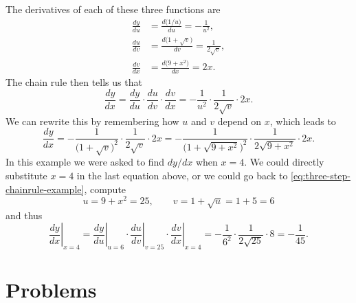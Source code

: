 The derivatives of each of these three functions are
\begin{align*}
\frac{dy}{du} &= \frac{d\bigl(1/u\bigr)}{du} = -\frac{1}{u^2}, \\
\frac{du}{dv} &= \frac{d \bigl(1+\sqrt{v}\bigr)}{dv} = \frac{1}{2\sqrt{v}},  \\
\frac{dv}{dx} &= \frac{d\bigl(9+x^2\bigr)}{dx} = 2x.
\end{align*}
The chain rule then tells us that
\begin{equation}
\frac{dy}{dx}=\frac{dy}{du}\cdot \frac{du}{dv}\cdot \frac{dv}{dx}
=-\frac{1}{u^2}\cdot\frac1{2\sqrt{v}}\cdot 2x.
\label{eq:three-step-chainrule-example}
\end{equation}
We can rewrite this by remembering how $u$ and $v$ depend on $x$, which leads to
\[
\frac{dy} {dx}
= -\frac{1}{\bigl(1+\sqrt{v}\bigr)^2}\cdot\frac1{2\sqrt{v}}\cdot 2x
= -\frac{1}{\bigl(1+\sqrt{9+x^2}\bigr)^2}\cdot\frac1{2\sqrt{9+x^2}}\cdot 2x.
\]
In this example we were asked to find $dy/dx$ when $x=4$. We could directly substitute $x=4$ in the last equation above, or we could go back to \eqref{eq:three-step-chainrule-example}, compute
\[
u=9+x^2 = 25, \qquad v=1+\sqrt{u}=1+5=6
\]
and thus
\[
\left.\frac{dy}{dx}\right|_{x=4}=
\left.\frac{dy}{du}\right|_{u=6}\cdot
\left.\frac{du}{dv}\right|_{v=25}\cdot
\left.\frac{dv}{dx}\right|_{x=4}
= - \frac1{6^2}\cdot\frac1{2\sqrt{25}}\cdot 8
= -\frac{1} {45}.
\]
















\section{Problems} 
\problemfont 




